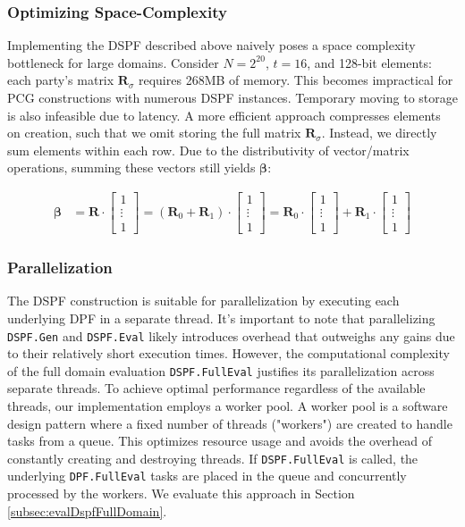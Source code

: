 \subsubsection{Optimizing Space-Complexity}
Implementing the DSPF described above naively poses a space complexity bottleneck for large domains. Consider  $N=2^{20}$, $t=16$, and 128-bit elements: each party's matrix $\boldsymbol{R}_\sigma$ requires 268MB of memory. This becomes impractical for PCG constructions with numerous DSPF instances.  Temporary moving to storage is also infeasible due to latency. A more efficient approach compresses elements on creation, such that we omit storing the full matrix $\boldsymbol{R}_\sigma$. Instead, we directly sum elements within each row. Due to the distributivity of vector/matrix operations, summing these vectors still yields $\boldsymbol{\beta}$:

\begin{equation}
\begin{aligned}
\label{eq:optimizedSpaceCompexity}
\boldsymbol{\beta} &= \boldsymbol{R} \cdot \begin{bmatrix} 1 \\ \vdots \\ 1 \end{bmatrix} = (\boldsymbol{R}_0 + \boldsymbol{R}_1 ) \cdot\begin{bmatrix} 1 \\ \vdots \\ 1 \end{bmatrix} = \boldsymbol{R}_0 \cdot\begin{bmatrix} 1 \\ \vdots \\ 1 \end{bmatrix} + \boldsymbol{R}_1 \cdot\begin{bmatrix} 1 \\ \vdots \\ 1 \end{bmatrix} 
\end{aligned}
\end{equation}

\subsubsection{Parallelization}
The DSPF construction is suitable for parallelization by executing each underlying DPF in a separate thread. It's important to note that parallelizing \texttt{DSPF.Gen} and \texttt{DSPF.Eval}  likely introduces overhead that outweighs any gains due to their relatively short execution times. However, the computational complexity of the full domain evaluation \texttt{DSPF.FullEval} justifies its parallelization across separate threads. To achieve optimal performance regardless of the available threads, our implementation employs a worker pool. A worker pool is a software design pattern where a fixed number of threads ("workers") are created to handle tasks from a queue. This optimizes resource usage and avoids the overhead of constantly creating and destroying threads. If \texttt{DSPF.FullEval} is called, the underlying \texttt{DPF.FullEval} tasks are placed in the queue and concurrently processed by the workers. We evaluate this approach in Section \ref{subsec:evalDspfFullDomain}.

